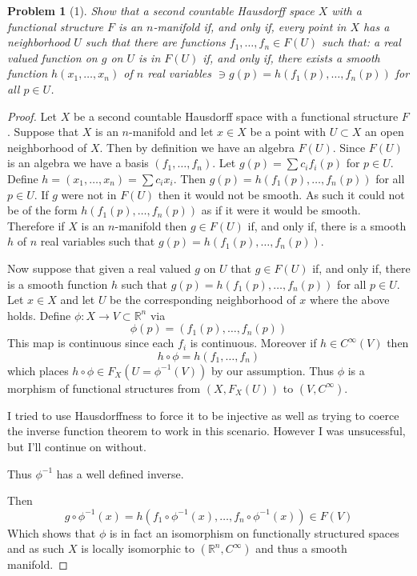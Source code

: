 \documentclass[10pt]{article}
\newcommand{\bb}[1]{\mathbb{#1}}
\theoremstyle{plain}
\newtheorem{problem}{Problem}
\theoremstyle{remark}
\begin{document}
\begin{problem}[1]
  Show that a second countable Hausdorff space $X$ with a functional
  structure $F$ is an $n$-manifold if, and only if, every point in
  $X$ has a neighborhood $U$ such that there are functions
  $f_1,\ldots,f_n\in F(U)$ such that: a real valued function on $g$
  on $U$ is in $F(U)$ if, and only if, there exists a smooth function
  $h(x_1,\ldots,x_n)$ of $n$ real variables $\ni g(p)=h(f_1(p),\ldots,f_n(p))$
  for all $p\in U$.
\end{problem}

\begin{proof}
  Let $X$ be a second countable Hausdorff space with a functional
  structure $F$. Suppose that $X$ is an $n$-manifold and let
  $x\in X$ be a point with $U\subset X$ an open neighborhood of $X$.
  Then by definition we have an algebra $F(U)$. Since $F(U)$
  is an algebra we have a basis $(f_1,\ldots,f_n)$. Let
  $g(p)=\sum c_if_i(p)$ for $p\in U$. Define $h=(x_1,\ldots,x_n)=\sum c_ix_i$.
  Then $g(p)=h(f_1(p),\ldots,f_n(p))$ for all $p\in U$. If $g$ were
  not in $F(U)$ then it would not be smooth. As such it could
  not be of the form $h(f_1(p),\ldots,f_n(p))$ as if it were it
  would be smooth. Therefore if $X$ is an $n$-manifold
  then $g\in F(U)$ if, and only if, there is a smooth $h$ of $n$ real
  variables such that $g(p)=h(f_1(p),\ldots,f_n(p))$. 

  Now suppose that given a real valued $g$ on $U$ that $g\in F(U)$
  if, and only if, there is a smooth function $h$ such that
  $g(p)=h(f_1(p),\ldots,f_n(p))$ for all $p\in U$. Let $x\in X$ and
  let $U$ be the corresponding neighborhood of $x$ where the
  above holds. Define $\phi:X\rightarrow V\subset\bb{R}^n$ via
  \[\phi(p)=(f_1(p),\ldots,f_n(p)) \]
  This map is continuous since each $f_i$ is continuous. Moreover
  if $h\in C^\infty(V)$ then
  \[ h\circ \phi=h(f_1,\ldots,f_n)\]
  which places $h\circ \phi\in F_X(U=\phi^{-1}(V))$ by our assumption. Thus
  $\phi$ is a morphism of functional structures from $(X,F_X(U))$
  to $(V,C^\infty)$.

  I tried to use Hausdorffness to force it to be injective as
  well as trying to coerce the inverse function theorem to work
  in this scenario. However I was unsucessful, but I'll continue
  on without.
  
  Thus $\phi^{-1}$ has a well defined inverse.

  Then
  \[ g\circ\phi^{-1}(x)=h(f_1\circ\phi^{-1}(x),\ldots,f_n\circ \phi^{-1}(x)) \in F(V) \]
  Which shows that $\phi$ is in fact an isomorphism on functionally
  structured spaces and as such $X$ is locally isomorphic to
  $(\bb{R}^n,C^\infty)$ and thus a smooth manifold.
\end{proof}
\end{document}
